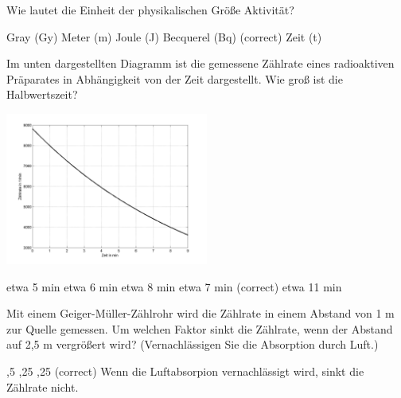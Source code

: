 \documentclass[11pt]{exam}
\begin{document}
\setlength{\voffset}{-0.5in}
\setlength{\headsep}{5pt}

\hspace{2mm}
 \hspace{5mm}
\vspace{4mm}

\begin{questions}

\question Wie lautet die Einheit der physikalischen Größe Aktivität?

\begin{choices}
	\choice Gray (Gy)
	\choice Meter (m)
	\choice Joule (J)
	\choice Becquerel (Bq) (correct)
	\choice Zeit (t)
\end{choices}

\vspace{3mm}\question Im unten dargestellten Diagramm ist die gemessene Zählrate eines radioaktiven Präparates in Abhängigkeit von der Zeit dargestellt. Wie groß ist die Halbwertszeit?

\includegraphics[width=0.5\textwidth]{../../../questions/K/images/zerfall2.png}

\begin{choices}
	\choice etwa 5 min
	\choice etwa 6 min
	\choice etwa 8 min
	\choice etwa 7 min (correct)
	\choice etwa 11 min
\end{choices}

\vspace{3mm}\question Mit einem Geiger-Müller-Zählrohr wird die Zählrate in einem Abstand von 1 m zur Quelle gemessen. Um welchen Faktor sinkt die Zählrate, wenn der Abstand auf 2,5 m vergrößert wird? (Vernachlässigen Sie die Absorption durch Luft.)

\begin{choices}
	,5
	,25
	,25 (correct)
	\choice Wenn die Luftabsorpion vernachlässigt wird, sinkt die Zählrate nicht.
\end{choices}


\end{questions}
\end{document}
